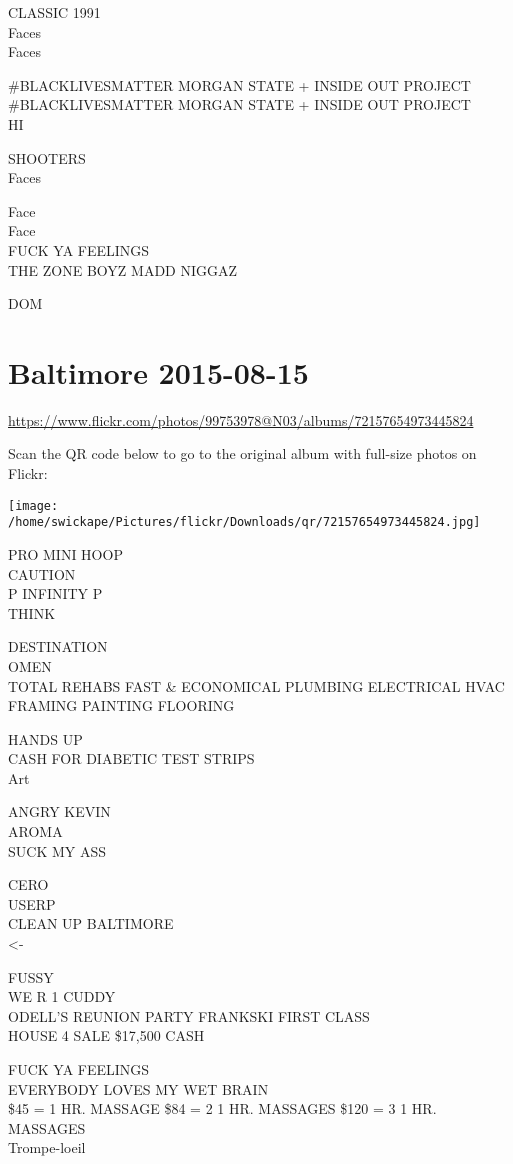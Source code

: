 \documentclass[10pt,letterpaper]{article}
\begin{document}
CLASSIC 1991\\
Faces\\
Faces

\#BLACKLIVESMATTER MORGAN STATE + INSIDE OUT PROJECT\\
\#BLACKLIVESMATTER MORGAN STATE + INSIDE OUT PROJECT\\
HI

SHOOTERS\\
Faces

Face\\
Face\\
FUCK YA FEELINGS\\
THE ZONE BOYZ MADD NIGGAZ

DOM
\pagebreak

\section*{Baltimore 2015-08-15}

\url{https://www.flickr.com/photos/99753978@N03/albums/72157654973445824}

Scan the QR code below to go to the original album with full-size photos on Flickr:

\texttt{[image: /home/swickape/Pictures/flickr/Downloads/qr/72157654973445824.jpg]}
\pagebreak

PRO MINI HOOP\\
CAUTION\\
P INFINITY P\\
THINK

DESTINATION\\
OMEN\\
TOTAL REHABS FAST \& ECONOMICAL PLUMBING ELECTRICAL HVAC FRAMING PAINTING FLOORING

HANDS UP\\
CASH FOR DIABETIC TEST STRIPS\\
Art

ANGRY KEVIN\\
AROMA\\
SUCK MY ASS

CERO\\
USERP\\
CLEAN UP BALTIMORE\\
<{-}

FUSSY\\
WE R 1 CUDDY\\
ODELL'S REUNION PARTY FRANKSKI FIRST CLASS\\
HOUSE 4 SALE \$17,500 CASH

FUCK YA FEELINGS\\
EVERYBODY LOVES MY WET BRAIN\\
\$45 = 1 HR. MASSAGE \$84 = 2 1 HR. MASSAGES  \$120 = 3 1 HR. MASSAGES\\
Trompe{-}loeil
\end{document}
